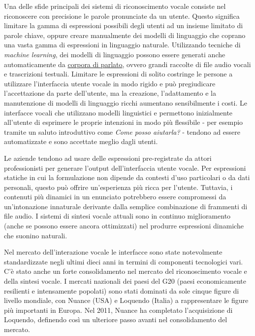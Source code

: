 \documentclass[]{../../metanetpaper}
\begin{document}
\begin{multicols}{2}
Una delle sfide principali dei sistemi di riconoscimento vocale consiste nel riconoscere con precisione le parole pronunciate da un utente. Questo significa limitare la gamma di espressioni possibili degli utenti ad un insieme limitato di parole chiave, oppure creare manualmente dei modelli di linguaggio che coprano una vasta gamma di espressioni in linguaggio naturale. Utilizzando tecniche di \emph{machine learning}, dei modelli di linguaggio possono essere generati anche automaticamente da \underline{corpora di parlato}, ovvero grandi raccolte di file audio vocali e trascrizioni testuali. Limitare le espressioni di solito costringe le persone a utilizzare l'interfaccia utente vocale in modo rigido e pu\`{o} pregiudicare l'accettazione da parte dell'utente, ma la creazione, l'adattamento e la manutenzione di modelli di linguaggio ricchi aumentano sensibilmente i costi. Le interfacce vocali che utilizzano modelli linguistici e permettono inizialmente all'utente di esprimere le proprie intenzioni in modo pi\`{u} flessibile - per esempio tramite un saluto introduttivo come \emph{Come posso aiutarla?} - tendono ad essere automatizzate e sono accettate meglio dagli utenti.

Le aziende tendono ad usare delle espressioni pre-registrate da attori professionisti per generare l'output dell'interfaccia utente vocale. Per  espressioni statiche in cui la formulazione non dipende da contesti d'uso particolari o da dati personali, questo pu\`{o} offrire un'esperienza pi\`{u} ricca per l'utente. Tuttavia, i contenuti pi\`{u} dinamici in un enunciato potrebbero essere compromessi da un'intonazione innaturale derivante dalla semplice combinazione di frammenti di file audio. I sistemi di sintesi vocale attuali sono in continuo miglioramento (anche se possono essere ancora ottimizzati) nel produrre espressioni dinamiche che suonino naturali.

Nel mercato dell'interazione vocale le interfacce sono state notevolmente standardizzate negli ultimi dieci anni in termini di componenti tecnologici vari. C'\`{e} stato anche un forte consolidamento nel mercato del riconoscimento vocale e della sintesi vocale. I mercati nazionali dei paesi del G20 (paesi economicamente resilienti e intensamente popolati) sono stati dominati da sole cinque figure di livello mondiale, con Nuance (USA) e Loquendo (Italia) a rappresentare le figure pi\`{u} importanti in Europa. Nel 2011, Nuance ha completato l'acquisizione di Loquendo, definendo cos\`{i} un ulteriore passo avanti nel consolidamento del mercato.


\end{multicols}
\end{document}
